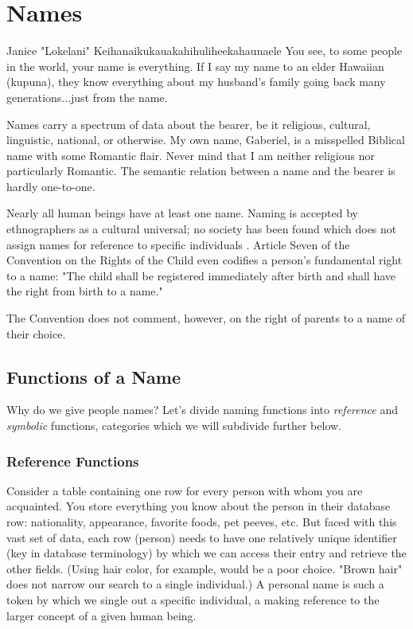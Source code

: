 \section{Names}

\begin{aquote}{Janice "Lokelani" Keihanaikukauakahihuliheekahaunaele}
You see, to some people in the world, your name is everything. If I say my name
to an elder Hawaiian (kupuna), they know everything about my husband's family
going back many generations...just from the name. \parencite{lee-valley}
\end{aquote}

Names carry a spectrum of data about the bearer, be it religious, cultural,
linguistic, national, or otherwise. My own name, Gaberiel, is a misspelled
Biblical name with some Romantic flair. Never mind that I am neither religious
nor particularly Romantic. The semantic relation between a name and the bearer
is hardly one-to-one.

Nearly all human beings have at least one name. Naming is accepted by
ethnographers as a cultural universal; no society has been found which does not
assign names for reference to specific individuals \parencite{alford88}. Article
Seven of the Convention on the Rights of the Child even codifies a person's
fundamental right to a name: "The child shall be registered immediately after
birth and shall have the right from birth to a name." \parencite{crc}

The
Convention does not comment, however, on the right of parents to a name of their
choice.

\subsection{Functions of a Name}

Why do we give people names? Let's divide naming functions into
\textit{reference} and \textit{symbolic} functions, categories which we will
subdivide further below.

\subsubsection{Reference Functions}

Consider a table containing one row for every person with whom you are
acquainted. You store everything you know about the person in their database
row: nationality, appearance, favorite foods, pet peeves, etc. But faced with
this vast set of data, each row (person) needs to have one relatively unique
identifier (key in database terminology) by which we can access their entry and
retrieve the other fields. (Using hair color, for example, would be a poor
choice. "Brown hair" does not narrow our search to a single individual.) A
personal name is such a token by which we single out a specific individual, a
making reference to the larger concept of a given human being.

